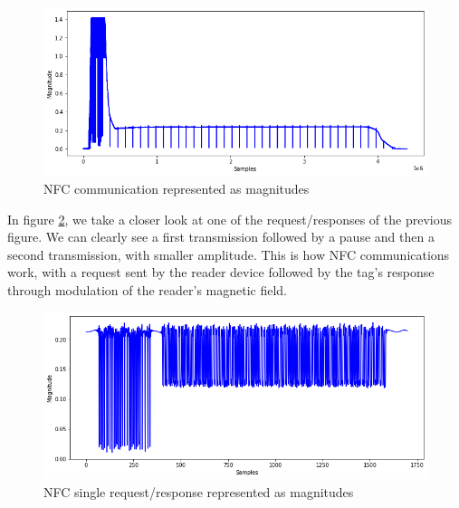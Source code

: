 \begin{figure}[htp!]
  \centering
  \includegraphics[scale=0.5]{figures/data_whole-transmission.png}
  \caption{NFC communication represented as magnitudes}
  \label{fig:nfc-full}
\end{figure}

In figure \ref{fig:nfc-single}, we take a closer look at one of the request/responses of the previous figure. We can clearly see a first transmission followed by a pause and then a second transmission, with smaller amplitude. This is how NFC communications work, with a request sent by the reader device followed by the tag's response through modulation of the reader's magnetic field.

\begin{figure}[htp!]
  \centering
  \includegraphics[scale=0.5]{figures/data_single-request-response.png}
  \caption{NFC single request/response represented as magnitudes}
  \label{fig:nfc-single}
\end{figure}
